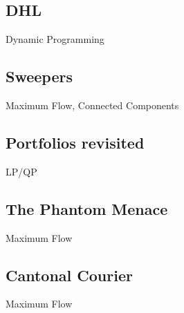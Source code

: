 \documentclass[10pt,a4paper,twoside]{report}
\begin{document}
\newpage
\subsection*{DHL}
\begin{keywords}Dynamic Programming\end{keywords}


\newpage
\subsection*{Sweepers}
\begin{keywords}Maximum Flow, Connected Components\end{keywords}


\newpage
\subsection*{Portfolios revisited}
\begin{keywords}LP/QP\end{keywords}


\newpage
\subsection*{The Phantom Menace}
\begin{keywords}Maximum Flow\end{keywords}



\newpage
\subsection*{Cantonal Courier}
\begin{keywords}Maximum Flow\end{keywords}



\printindex
\end{document}
